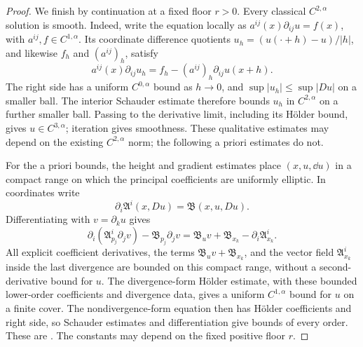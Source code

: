 \begin{proof}
We finish by continuation at a fixed floor $r>0$. Every classical
$C^{2,\alpha}$ solution is smooth. Indeed, write the equation locally
as $a^{ij}(x)\partial_{ij}u=f(x)$, with $a^{ij},f\in C^{1,\alpha}$.
Its coordinate difference quotients $u_h=(u(\cdot+h)-u)/|h|$, and
likewise $f_h$ and $(a^{ij})_h$, satisfy
\[
 a^{ij}(x)\partial_{ij}u_h
   =f_h-(a^{ij})_h\partial_{ij}u(x+h).
\]
The right side has a uniform $C^{0,\alpha}$ bound as $h\to0$, and
$\sup|u_h|\le\sup|Du|$ on a smaller ball. The interior Schauder
estimate \citep[Lecture~12, Theorem~2]{simonPDE} therefore bounds
$u_h$ in $C^{2,\alpha}$ on a further smaller ball. Passing to the
derivative limit, including its H\"older bound, gives
$u\in C^{3,\alpha}$; iteration gives smoothness. These qualitative
estimates may depend on the existing $C^{2,\alpha}$ norm; the following
a priori estimates do not.

For the a priori bounds, the height and
gradient estimates place $(x,u,\dd u)$ in a compact range on which the
principal coefficients are uniformly elliptic. In coordinates write
\[
 \partial_i\mathfrak A^i(x,Du)=\mathfrak B(x,u,Du).
\]
Differentiating with $v=\partial_ku$ gives
\begin{equation}\label{step:differentiated}
 \partial_i(\mathfrak A^i_{p_j}\partial_jv)
 -\mathfrak B_{p_j}\partial_jv
 =\mathfrak B_u v+\mathfrak B_{x_k}
   -\partial_i\mathfrak A^i_{x_k}.
\end{equation}
All explicit coefficient derivatives, the terms $\mathfrak B_uv+\mathfrak B_{x_k}$,
and the vector field $\mathfrak A^i_{x_k}$ inside the last divergence
are bounded on this compact range, without a second-derivative bound
for $u$. The divergence-form H\"older estimate, with these bounded
lower-order coefficients and divergence data, gives a uniform
$C^{1,\alpha}$ bound for $u$ on a finite cover. The nondivergence-form
equation then has H\"older coefficients and right side, so Schauder
estimates and differentiation give bounds of every order. These are
\citet[Lecture~18, Theorem~3, and Lecture~12, Theorem~2]{simonPDE}.
The constants may depend on the fixed positive floor $r$.


\end{proof}
